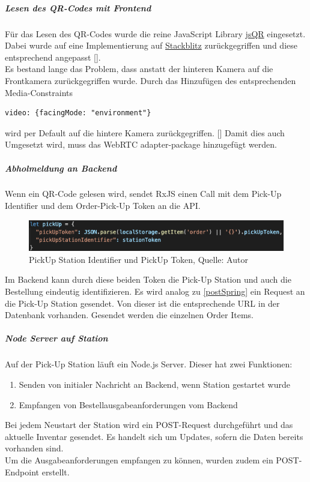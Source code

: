 \subparagraph{Lesen des QR-Codes mit Frontend}
Für das Lesen des QR-Codes wurde die reine JavaScript Library \href{https://github.com/cozmo/jsQR}{jsQR} eingesetzt. 
Dabei wurde auf eine Implementierung auf \href{https://stackblitz.com/edit/angular-jsqr?file=package.json}{Stackblitz} zurückgegriffen und diese entsprechend angepasst [\cite{jsQrStackblitz}]. \\
Es bestand lange das Problem, dass anstatt der hinteren Kamera auf die Frontkamera zurückgegriffen wurde. Durch das Hinzufügen des entsprechenden Media-Constraints \begin{verbatim}
video: {facingMode: "environment"}
\end{verbatim} wird per Default auf die hintere Kamera zurückgegriffen. [\cite{mediaStream}]
Damit dies auch Umgesetzt wird, muss das WebRTC adapter-package hinzugefügt werden. 
\subparagraph{Abholmeldung an Backend}
Wenn ein QR-Code gelesen wird, sendet \gls{RxJS} einen Call mit dem Pick-Up Identifier und dem Order-Pick-Up Token an die API. 
\begin{figure}[H]
	\centering
	\includegraphics[width=1\textwidth]{images/pickUpBody.PNG}
	\caption[PickUp Station Identifier und PickUp Token]{PickUp Station Identifier und PickUp Token, Quelle: Autor}
	\label{img: pickUpBody}
\end{figure} 
\newpage
Im Backend kann durch diese beiden Token die Pick-Up Station und auch die Bestellung eindeutig identifizieren. 
Es wird analog zu \ref{postSpring} ein Request an die Pick-Up Station gesendet. Von dieser ist die entsprechende \ac{URL} in der Datenbank vorhanden. Gesendet werden die einzelnen Order Items. 
\subparagraph{Node Server auf Station}\label{nodeStation}
Auf der Pick-Up Station läuft ein Node.js Server. Dieser hat zwei Funktionen: 
\begin{enumerate}
	\item Senden von initialer Nachricht an Backend, wenn Station gestartet wurde
	\item Empfangen von Bestellausgabeanforderungen vom Backend
\end{enumerate}
Bei jedem Neustart der Station wird ein POST-Request durchgeführt und das aktuelle Inventar gesendet. Es handelt sich um Updates, sofern die Daten bereits vorhanden sind. \\
Um die Ausgabeanforderungen empfangen zu können, wurden zudem ein POST-Endpoint erstellt. 
